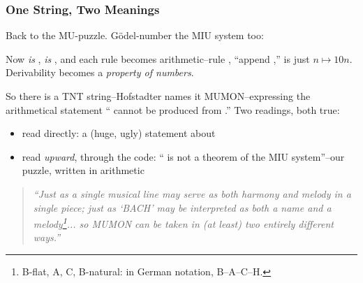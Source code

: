 \documentclass[aspectratio=169]{beamer}
\newcommand{\tm}[1]{\text{\color{textColor}\texttt{#1}}}
\newcommand{\rname}[1]{\text{\small\color{auxColor}\textsc{#1}}}
\begin{document}
\begin{frame}[fragile]
  \frametitle{One String, Two Meanings}


  Back to the MU-puzzle. G\"odel-number the MIU system too:

  \begin{center}
     \qquad {} \qquad {}
  \end{center}

  \vspace{-3pt}
  Now \tm{MI} \textit{is} , \tm{MU} \textit{is} ,
  and each rule becomes arithmetic--rule \rname{I}, ``append \tm{U},''
  is just $n \mapsto 10n$. Derivability becomes a \textit{property of numbers}.

  \pause
  \vspace{\fill}

  So there is a TNT string--Hofstadter names it MUMON--expressing the
  arithmetical statement `` cannot be produced from
  .'' Two readings, both true:

  \begin{itemize}
    \item read directly: a (huge, ugly) statement about 
    \item read \textit{upward}, through the code: ``\tm{MU} is not a
      theorem of the MIU system''--our puzzle, written in arithmetic
  \end{itemize}

  \pause
  \vspace{\fill}

  \begin{quote}
    {\small \textit{``Just as a single musical line may serve as both
    harmony and melody in a single piece; just as `BACH' may be
    interpreted as both a name and a melody\footnote{B-flat, A, C,
    B-natural: in German notation, B--A--C--H.}... so MUMON can be
    taken in (at least) two entirely different ways.''}}
  \end{quote}
\end{frame}

\end{document}
